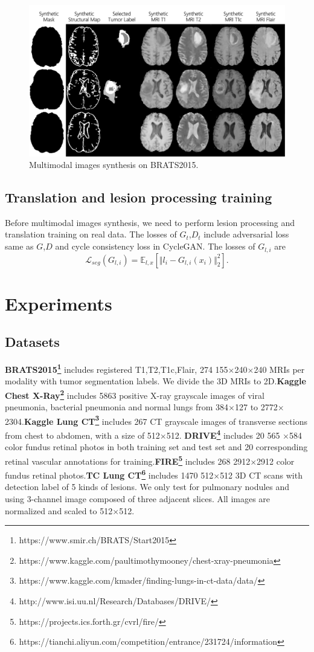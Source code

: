 \documentclass[runningheads]{llncs}
\begin{document}
	\begin{figure}
		\centering
		\includegraphics[width=0.6\linewidth]{figures/F_to_MRI}
		\caption{Multimodal images synthesis on BRATS2015.}
		\label{generated_mri}
	\end{figure}
	\subsection{Translation and lesion processing training}
	Before multimodal images synthesis, we need to perform lesion processing and translation training on real data. The losses of $G_t$,$D_t$ include adversarial loss same as  $G$,$D$ and cycle consistency loss in CycleGAN.
	The losses of $G_{l,i}$ are 
	\begin{equation}
	\label{lesion segmentation loss}
	\mathcal{L}_{seg}(G_{l,i})=\mathbb{E}_{l,x}[\Vert{l_i-G_{l,i}(x_{i})}\Vert_{2}^{2}].
	\end{equation}
	
	\section{Experiments}
	\subsection{Datasets}
	\textbf{BRATS2015\footnote{https://www.smir.ch/BRATS/Start2015}} includes registered T1,T2,T1c,Flair, 274 155$\times$240$\times$240 MRIs per modality with tumor segmentation labels. We divide the 3D MRIs to 2D.\textbf{Kaggle Chest X-Ray\footnote{https://www.kaggle.com/paultimothymooney/chest-xray-pneumonia }} includes 5863 positive X-ray grayscale images of viral pneumonia, bacterial pneumonia and normal lungs from 384$\times$127 to 2772$\times$2304.\textbf{Kaggle Lung CT\footnote{https://www.kaggle.com/kmader/finding-lungs-in-ct-data/data/}} includes 267  CT grayscale images of transverse sections from chest to abdomen, with a size of 512$\times$512. \textbf{DRIVE\footnote{http://www.isi.uu.nl/Research/Databases/DRIVE/}} includes 20 565 $\times $584 color fundus retinal photos in both training set and test set and 20 corresponding retinal vascular annotations for training.\textbf{FIRE\footnote{https://projects.ics.forth.gr/cvrl/fire/}} includes 268 2912$\times$2912 color fundus retinal photos.\textbf{TC Lung CT\footnote{https://tianchi.aliyun.com/competition/entrance/231724/information}} includes 1470 512$\times$512 3D CT scans with detection label of 5 kinds of lesions. We only test for pulmonary nodules and using 3-channel image composed of three adjacent slices. All images are normalized and scaled to 512$\times$512.
	
\end{document}
